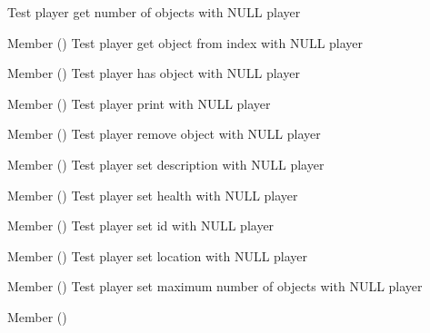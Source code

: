 \begin{DoxyRefList}
%
Test player get number of objects with NULL player  
\item[Member \doxylink{player__test_8c_aae715732b4bd9e99580340c109518d7e}{test2\+\_\+player\+\_\+get\+\_\+object\+\_\+from\+\_\+index} ()]\label{test__test000090}%
%
Test player get object from index with NULL player  
\item[Member \doxylink{player__test_8c_ae8953d45d8f555a930dbc8aba101d399}{test2\+\_\+player\+\_\+has\+\_\+object} ()]\label{test__test000096}%
%
Test player has object with NULL player  
\item[Member \doxylink{player__test_8c_a46b5c792a37831e8c142d4c32b9767f7}{test2\+\_\+player\+\_\+print} ()]\label{test__test000084}%
%
Test player print with NULL player  
\item[Member \doxylink{player__test_8c_af9e74e12ad6961761f1ff61afa56be3e}{test2\+\_\+player\+\_\+remove\+\_\+object} ()]\label{test__test000094}%
%
Test player remove object with NULL player  
\item[Member \doxylink{player__test_8c_a1e47a0571a050194ebe7f0cf6102033e}{test2\+\_\+player\+\_\+set\+\_\+description} ()]\label{test__test000080}%
%
Test player set description with NULL player  
\item[Member \doxylink{player__test_8c_aca602481af023c45a1fe6825860aa184}{test2\+\_\+player\+\_\+set\+\_\+health} ()]\label{test__test000074}%
%
Test player set health with NULL player  
\item[Member \doxylink{player__test_8c_a3695e0896bc3d770290e6a691fa212f7}{test2\+\_\+player\+\_\+set\+\_\+id} ()]\label{test__test000066}%
%
Test player set id with NULL player  
\item[Member \doxylink{player__test_8c_a2c702753d9e2e3df9ef4abf2d1b9bc8d}{test2\+\_\+player\+\_\+set\+\_\+location} ()]\label{test__test000088}%
%
Test player set location with NULL player  
\item[Member \doxylink{player__test_8c_aebb4907ff20d7692475a1f599182e5de}{test2\+\_\+player\+\_\+set\+\_\+max\+\_\+objs} ()]\label{test__test000100}%
%
Test player set maximum number of objects with NULL player  
\item[Member \doxylink{player__test_8c_a6e7ce8ff791f4bf63749df647a44263f}{test2\+\_\+player\+\_\+set\+\_\+name} ()]\label{test__test000070}%

\end{DoxyRefList}

